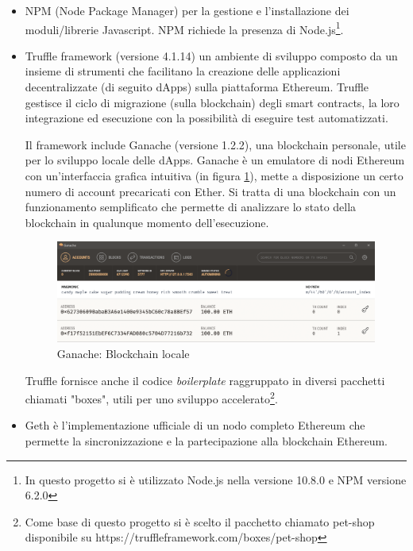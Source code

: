 \begin{itemize}
\item NPM (Node Package Manager) per la gestione e l'installazione dei moduli/librerie Javascript. NPM richiede la presenza di Node.js\footnote{In questo progetto si è utilizzato Node.js nella versione 10.8.0 e NPM versione 6.2.0}.

\item Truffle framework (versione 4.1.14) un ambiente di sviluppo composto da un insieme di strumenti che facilitano la creazione delle applicazioni decentralizzate (di seguito dApps) sulla piattaforma Ethereum. Truffle gestisce il ciclo di migrazione (sulla blockchain) degli smart contracts, la loro integrazione ed esecuzione con la possibilità di eseguire test automatizzati.

Il framework include Ganache (versione 1.2.2), una blockchain personale, utile per lo sviluppo locale delle dApps. Ganache è un emulatore di nodi Ethereum con un'interfaccia grafica intuitiva (in figura {\ref{fig:ganache}}), mette a disposizione un certo numero di account precaricati con Ether. Si tratta di una blockchain con un funzionamento semplificato che permette di analizzare lo stato della blockchain in qualunque momento dell'esecuzione.

\begin{figure}[H]
\centering
\includegraphics[width=1\textwidth]{immagini/ganache-window.png}
\caption{Ganache: Blockchain locale}
\label{fig:ganache}
\end{figure}

Truffle fornisce anche il codice \emph{boilerplate} raggruppato in diversi pacchetti chiamati "boxes", utili per uno sviluppo accelerato\footnote{Come base di questo progetto si è scelto il pacchetto chiamato pet-shop disponibile su https://truffleframework.com/boxes/pet-shop}.

\item Geth è l'implementazione ufficiale di un nodo completo Ethereum che permette la sincronizzazione e la partecipazione alla blockchain Ethereum.


\end{itemize}
